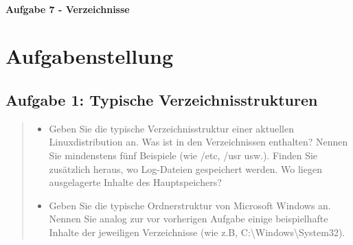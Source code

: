\newpage

\paragraph{\LARGE Aufgabe 7 - Verzeichnisse}

\section{Aufgabenstellung}
	\subsection{Aufgabe 1: Typische Verzeichnisstrukturen}
		\begin{quote}
			\begin{itemize}
				\item Geben Sie die typische Verzeichnisstruktur einer aktuellen Linuxdistribution an. Was ist in den Verzeichnissen enthalten? Nennen Sie mindenstens f\"unf Beispiele (wie /etc, /usr usw.). Finden Sie zus\"atzlich heraus, wo Log-Dateien gespeichert werden. Wo liegen ausgelagerte Inhalte des Hauptspeichers?\\
				\item Geben Sie die typische Ordnerstruktur von Microsoft Windows an. Nennen Sie analog zur vor vorherigen Aufgabe einige beispielhafte Inhalte der jeweiligen Verzeichnisse (wie z.B, C:\textbackslash Windows\textbackslash System32).\\
			\end{itemize}
		\end{quote}
